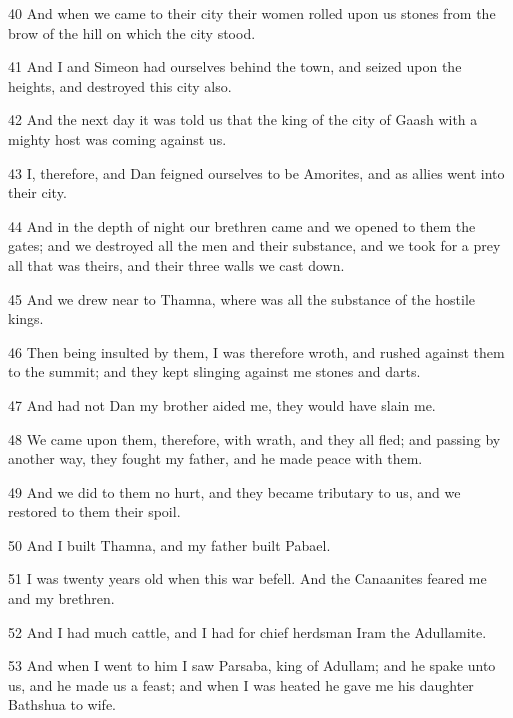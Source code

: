 \par 40 And when we came to their city their women rolled upon us stones from the brow of the hill on which the city stood.

\par 41 And I and Simeon had ourselves behind the town, and seized upon the heights, and destroyed this city also.

\par 42 And the next day it was told us that the king of the city of Gaash with a mighty host was coming against us.

\par 43 I, therefore, and Dan feigned ourselves to be Amorites, and as allies went into their city.

\par 44 And in the depth of night our brethren came and we opened to them the gates; and we destroyed all the men and their substance, and we took for a prey all that was theirs, and their three walls we cast down.

\par 45 And we drew near to Thamna, where was all the substance of the hostile kings.

\par 46 Then being insulted by them, I was therefore wroth, and rushed against them to the summit; and they kept slinging against me stones and darts.

\par 47 And had not Dan my brother aided me, they would have slain me.

\par 48 We came upon them, therefore, with wrath, and they all fled; and passing by another way, they fought my father, and he made peace with them.

\par 49 And we did to them no hurt, and they became tributary to us, and we restored to them their spoil.

\par 50 And I built Thamna, and my father built Pabael.

\par 51 I was twenty years old when this war befell. And the Canaanites feared me and my brethren.

\par 52 And I had much cattle, and I had for chief herdsman Iram the Adullamite.

\par 53 And when I went to him I saw Parsaba, king of Adullam; and he spake unto us, and he made us a feast; and when I was heated he gave me his daughter Bathshua to wife.


